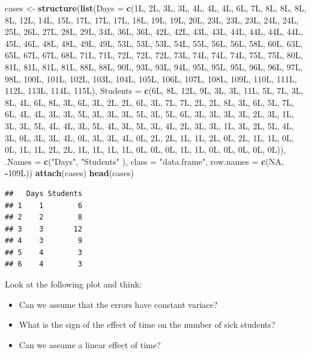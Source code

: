 \documentclass[]{book}
\newenvironment{Shaded}{\begin{snugshade}}{\end{snugshade}}
\newcommand{\KeywordTok}[1]{\textcolor[rgb]{0.13,0.29,0.53}{\textbf{#1}}}
\newcommand{\DataTypeTok}[1]{\textcolor[rgb]{0.13,0.29,0.53}{#1}}
\newcommand{\StringTok}[1]{\textcolor[rgb]{0.31,0.60,0.02}{#1}}
\newcommand{\OtherTok}[1]{\textcolor[rgb]{0.56,0.35,0.01}{#1}}
\newcommand{\OperatorTok}[1]{\textcolor[rgb]{0.81,0.36,0.00}{\textbf{#1}}}
\newcommand{\NormalTok}[1]{#1}
\providecommand{\tightlist}{%
  \setlength{\itemsep}{0pt}\setlength{\parskip}{0pt}}
\theoremstyle{definition}
\theoremstyle{definition}
\theoremstyle{definition}
\theoremstyle{remark}
\begin{document}
\begin{Shaded}
\begin{Highlighting}[]
\NormalTok{cases <-}\StringTok{  }
\KeywordTok{structure}\NormalTok{(}\KeywordTok{list}\NormalTok{(}\DataTypeTok{Days =} \KeywordTok{c}\NormalTok{(1L, 2L, 3L, 3L, 4L, 4L, 4L, 6L, 7L, 8L, }
\NormalTok{8L, 8L, 8L, 12L, 14L, 15L, 17L, 17L, 17L, 18L, 19L, 19L, 20L, }
\NormalTok{23L, 23L, 23L, 24L, 24L, 25L, 26L, 27L, 28L, 29L, 34L, 36L, 36L, }
\NormalTok{42L, 42L, 43L, 43L, 44L, 44L, 44L, 44L, 45L, 46L, 48L, 48L, 49L, }
\NormalTok{49L, 53L, 53L, 53L, 54L, 55L, 56L, 56L, 58L, 60L, 63L, 65L, 67L, }
\NormalTok{67L, 68L, 71L, 71L, 72L, 72L, 72L, 73L, 74L, 74L, 74L, 75L, 75L, }
\NormalTok{80L, 81L, 81L, 81L, 81L, 88L, 88L, 90L, 93L, 93L, 94L, 95L, 95L, }
\NormalTok{95L, 96L, 96L, 97L, 98L, 100L, 101L, 102L, 103L, 104L, 105L, }
\NormalTok{106L, 107L, 108L, 109L, 110L, 111L, 112L, 113L, 114L, 115L), }
    \DataTypeTok{Students =} \KeywordTok{c}\NormalTok{(6L, 8L, 12L, 9L, 3L, 3L, 11L, 5L, 7L, 3L, 8L, }
\NormalTok{    4L, 6L, 8L, 3L, 6L, 3L, 2L, 2L, 6L, 3L, 7L, 7L, 2L, 2L, 8L, }
\NormalTok{    3L, 6L, 5L, 7L, 6L, 4L, 4L, 3L, 3L, 5L, 3L, 3L, 3L, 5L, 3L, }
\NormalTok{    5L, 6L, 3L, 3L, 3L, 3L, 2L, 3L, 1L, 3L, 3L, 5L, 4L, 4L, 3L, }
\NormalTok{    5L, 4L, 3L, 5L, 3L, 4L, 2L, 3L, 3L, 1L, 3L, 2L, 5L, 4L, 3L, }
\NormalTok{    0L, 3L, 3L, 4L, 0L, 3L, 3L, 4L, 0L, 2L, 2L, 1L, 1L, 2L, 0L, }
\NormalTok{    2L, 1L, 1L, 0L, 0L, 1L, 1L, 2L, 2L, 1L, 1L, 1L, 1L, 0L, 0L, }
\NormalTok{    0L, 1L, 1L, 0L, 0L, 0L, 0L, 0L)), }\DataTypeTok{.Names =} \KeywordTok{c}\NormalTok{(}\StringTok{"Days"}\NormalTok{, }\StringTok{"Students"}
\NormalTok{), }\DataTypeTok{class =} \StringTok{"data.frame"}\NormalTok{, }\DataTypeTok{row.names =} \KeywordTok{c}\NormalTok{(}\OtherTok{NA}\NormalTok{, }\OperatorTok{-}\NormalTok{109L))}
\KeywordTok{attach}\NormalTok{(cases)}
\KeywordTok{head}\NormalTok{(cases) }
\end{Highlighting}
\end{Shaded}

\begin{verbatim}
##   Days Students
## 1    1        6
## 2    2        8
## 3    3       12
## 4    3        9
## 5    4        3
## 6    4        3
\end{verbatim}

Look at the following plot and think:

\begin{itemize}
\tightlist
\item
  Can we assume that the errors have constant variace?
\item
  What is the sign of the effect of time on the number of sick students?
\item
  Can we assume a linear effect of time?
\end{itemize}
\end{document}
